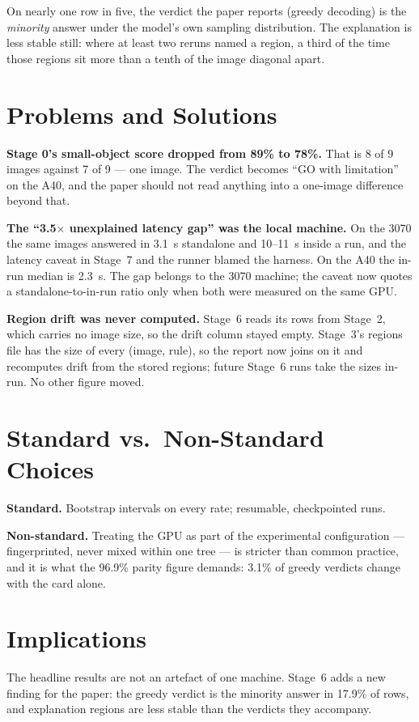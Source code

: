 On nearly one row in five, the verdict the paper reports (greedy decoding) is the \emph{minority} answer
under the model's own sampling distribution. The explanation is less stable still: where at least two
reruns named a region, a third of the time those regions sit more than a tenth of the image diagonal apart.

\section{Problems and Solutions}

\textbf{Stage 0's small-object score dropped from 89\% to 78\%.} That is 8 of 9 images against 7 of 9 --- one
image. The verdict becomes ``GO with limitation'' on the A40, and the paper should not read anything into a
one-image difference beyond that.

\textbf{The ``3.5$\times$ unexplained latency gap'' was the local machine.} On the 3070 the same images
answered in 3.1~s standalone and 10--11~s inside a run, and the latency caveat in Stage~7 and the runner
blamed the harness. On the A40 the in-run median is 2.3~s. The gap belongs to the 3070 machine; the caveat
now quotes a standalone-to-in-run ratio only when both were measured on the same GPU.

\textbf{Region drift was never computed.} Stage~6 reads its rows from Stage~2, which carries no image size,
so the drift column stayed empty. Stage~3's regions file has the size of every (image, rule), so the report
now joins on it and recomputes drift from the stored regions; future Stage~6 runs take the sizes in-run.
No other figure moved.

\section{Standard vs.\ Non-Standard Choices}

\textbf{Standard.} Bootstrap intervals on every rate; resumable, checkpointed runs.

\textbf{Non-standard.} Treating the GPU as part of the experimental configuration --- fingerprinted, never
mixed within one tree --- is stricter than common practice, and it is what the 96.9\% parity figure demands:
3.1\% of greedy verdicts change with the card alone.

\section{Implications}

The headline results are not an artefact of one machine. Stage~6 adds a new finding for the paper: the
greedy verdict is the minority answer in 17.9\% of rows, and explanation regions are less stable than the
verdicts they accompany.
